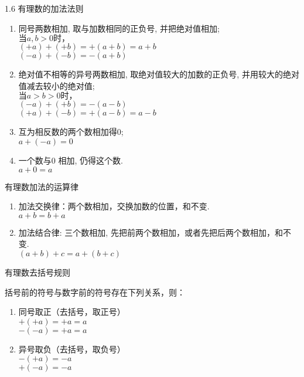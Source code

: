 \documentclass[aspectratio=169]{ctexbeamer} %
\date{\today}
\begin{document}
\begin{frame}[t]{1.6 有理数的加法法则}
\begin{spacing}{1.1} %
\normalsize
\begin{enumerate}[label={\arabic*.}]
\item 同号两数相加, 取与加数相同的正负号, 并把绝对值相加; \\
$\text{当}a,b  > 0\text{时，}$ \\
$(+a) + (+b) = +(a+b) = a + b$ \\
$(-a) + (-b) = -(a+b)$ \\
\item 绝对值不相等的异号两数相加, 取绝对值较大的加数的正负号, 并用较大的绝对值减去较小的绝对值; \\
$\text{当}a > b > 0\text{时，}$ \\
$(-a) + (+b) = -(a-b)$ \\
$(+a) + (-b) = +(a-b) = a - b$ \\
\item 互为相反数的两个数相加得0; \\
 $a + (-a) = 0$ \\
\item 一个数与0 相加, 仍得这个数. \\
$a + 0 = a $\\
\end{enumerate}
\end{spacing}
\end{frame}

\begin{frame}[t]{有理数加法的运算律}
\begin{spacing}{1.5} %
\Large
\begin{enumerate}[label={\arabic*.}]
\item 加法交换律：两个数相加，交换加数的位置，和不变. \\
$a + b = b + a$
\item 加法结合律: 三个数相加, 先把前两个数相加，或者先把后两个数相加，和不变. \\
$(a + b) + c = a + (b + c)$
\end{enumerate}
\end{spacing}
\end{frame}

\begin{frame}[t]{有理数去括号规则}
\begin{spacing}{1.2} %
\Large
括号前的符号与数字前的符号存在下列关系，则：
\begin{enumerate}[label={\arabic*.}]
\item 同号取正（去括号，取正号） \\
$+(+a) = +a = a$ \\
$-(-a) = +a = a$ 
\item 异号取负（去括号，取负号）\\
$-(+a) = -a$ \\
$+(-a) = -a$ \\
\end{enumerate}
\end{spacing}
\end{frame}
\end{document}
